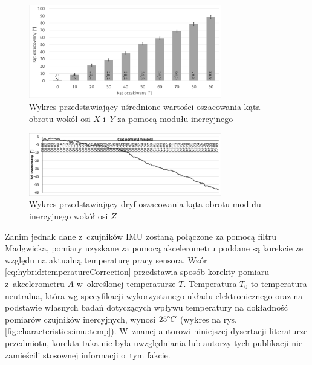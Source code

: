 \begin{figure}[!htb]
							
	\centering 
	\includegraphics[width=0.75\textwidth]{images/imumeasuredAngles.png}
	\caption{Wykres przedstawiający uśrednione wartości oszacowania kąta obrotu wokół osi $X$ i~$Y$ za pomocą modułu inercyjnego}
	\label{fig:hybrid:imu:XYRot}
\end{figure}
\begin{figure}[!htb]
	\centering 
	\includegraphics[width=0.75\textwidth]{images/imuDrift.png}
	\caption{Wykres przedstawiający dryf oszacowania kąta obrotu modułu inercyjnego wokół osi $Z$}
	\label{fig:hybrid:imu:drift}
						
\end{figure}

Zanim jednak dane z~czujników IMU zostaną połączone za pomocą filtru Madgwicka, pomiary uzyskane za pomocą akcelerometru poddane są korekcie ze względu na aktualną temperaturę pracy sensora. Wzór \eqref{eq:hybrid:temperatureCorrection} przedstawia sposób korekty pomiaru z~akcelerometru  $A$ w~określonej temperaturze $T$. Temperatura $T_0$ to temperatura neutralna, która wg specyfikacji wykorzystanego układu elektronicznego oraz na podstawie własnych badań 
dotyczących wpływu temperatury na dokładność pomiarów czujników inercyjnych, wynosi $25\degree C$ (wykres na rys. \ref{fig:characteristics:imu:temp}). W~znanej autorowi niniejszej dysertacji literaturze przedmiotu, korekta taka nie była uwzględniania lub autorzy tych publikacji nie zamieścili stosownej informacji o~tym fakcie.

